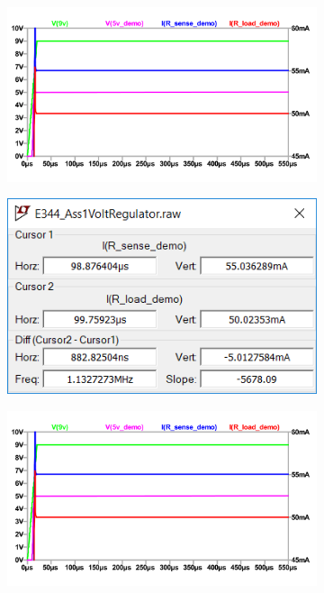 {\begin{figure}
 \footnotesize
 \centering
    \begin{subfigure}[]{0.55\textwidth}
              \centering
  		\includegraphics[width=1\linewidth]{./Figures/E344_VoltRegulator.pdf}
		    \caption{} \label{subfig:pwr_simu_rect}
     \end{subfigure}
     \begin{subfigure}[]{0.4\textwidth}
             \centering
  		\includegraphics[width=1.0\linewidth]{./Figures/Screengrab2}
		   \caption{ } \label{subfig:pwr_meas_rect}
     \end{subfigure}
    \begin{subfigure}[]{0.55\textwidth}
              \centering
  		\includegraphics[width=1\linewidth]{./Figures/E344_VoltRegulator.pdf}

\end{subfigure}
\end{figure}}
